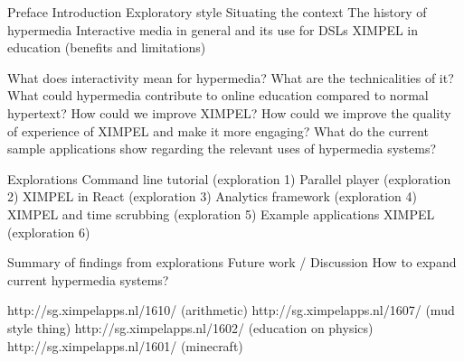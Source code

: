 Preface
Introduction
    Exploratory style
    Situating the context
        The history of hypermedia
        Interactive media in general and its use for DSLs
        XIMPEL in education (benefits and limitations)

What does interactivity mean for hypermedia?
    What are the technicalities of it?
What could hypermedia contribute to online education compared to normal hypertext?
How could we improve XIMPEL?
How could we improve the quality of experience of XIMPEL and make it more engaging?
What do the current sample applications show regarding the relevant uses of hypermedia systems?

Explorations
    Command line tutorial (exploration 1)
    Parallel player (exploration 2)
    XIMPEL in React (exploration 3)
    Analytics framework (exploration 4)
    XIMPEL and time scrubbing (exploration 5)
    Example applications XIMPEL (exploration 6)

Summary of findings from explorations
Future work / Discussion
    How to expand current hypermedia systems?






http://sg.ximpelapps.nl/1610/ (arithmetic)
http://sg.ximpelapps.nl/1607/ (mud style thing)
http://sg.ximpelapps.nl/1602/ (education on physics)
http://sg.ximpelapps.nl/1601/ (minecraft)